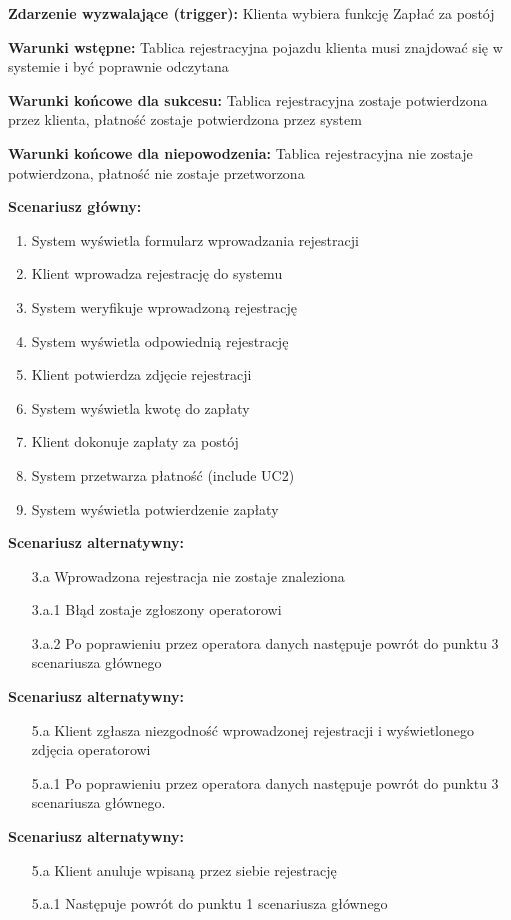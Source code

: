 \hspace{0cm}\textbf{Zdarzenie wyzwalające (trigger): }Klienta wybiera funkcję Zapłać za postój

\hspace{0cm}\textbf{Warunki wstępne: }Tablica rejestracyjna pojazdu klienta musi znajdować się w systemie i być poprawnie odczytana

\hspace{0cm}\textbf{Warunki końcowe dla sukcesu: }
Tablica rejestracyjna zostaje potwierdzona przez klienta, płatność zostaje potwierdzona przez system

\hspace{0cm}\textbf{Warunki końcowe dla niepowodzenia: }Tablica rejestracyjna nie zostaje potwierdzona, płatność nie zostaje przetworzona \newline

\hspace{0cm}\textbf{Scenariusz główny: }
\begin{enumerate}
\item System wyświetla formularz wprowadzania rejestracji
\item Klient wprowadza rejestrację do systemu
\item System weryfikuje wprowadzoną rejestrację
\item System wyświetla odpowiednią rejestrację
\item Klient potwierdza zdjęcie rejestracji
\item System wyświetla kwotę do zapłaty
\item Klient dokonuje zapłaty za postój
\item System przetwarza płatność (include UC2)
\item System wyświetla potwierdzenie zapłaty
\end{enumerate}
\hspace{0cm}\textbf{Scenariusz alternatywny: }
\begin{enumerate}
\item[3.a] Wprowadzona rejestracja nie zostaje znaleziona
\item[3.a.1] Błąd zostaje zgłoszony operatorowi
\item[3.a.2] Po poprawieniu przez operatora danych następuje powrót do punktu 3 scenariusza głównego 
\end{enumerate}
\hspace{0cm}\textbf{Scenariusz alternatywny: }
\begin{enumerate}
\item[5.a] Klient zgłasza niezgodność wprowadzonej rejestracji i wyświetlonego zdjęcia operatorowi
\item[5.a.1] Po poprawieniu przez operatora danych następuje powrót do punktu 3 scenariusza głównego.
\end{enumerate}
\hspace{0cm}\textbf{Scenariusz alternatywny: }
\begin{enumerate}
\item[5.a] Klient anuluje wpisaną przez siebie rejestrację 
\item[5.a.1] Następuje powrót do punktu 1 scenariusza głównego
\end{enumerate}
